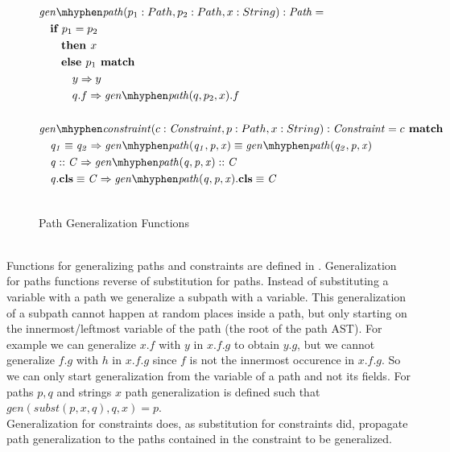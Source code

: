 \begin{figure}[t]
\centering
\begin{align*}
&\genp(p_1: Path, p_2: Path, x: String):\mIt{Path} = \\
&\quad\If p_1 = p_2\\
&\qquad \Then x\\
&\qquad \Else p_1 \match\\
&\qquad\quad y \Rightarrow y\\
&\qquad\quad q.f \Rightarrow \genp(q, p_2, x).f\\
\\
&\genc(c: \Constr, p: Path, x: String): \Constr = c \match\\
&\quad \case{\pathEq{q_1}{q_2}}
  {\pathEq
    {\genp(q_1, p, x)}
    {\genp(q_2, p, x)}}\\
&\quad \case{\instOf{q}{C}}
  {\instOf{\genp(q, p, x)}{C}}\\
&\quad \case{\instBy{q}{C}}
  {\instBy{\genp(q, p, x)}{C}}\\\\
\end{align*}
\caption{Path Generalization Functions}
\label{fig:axioms-general-gen}
\end{figure}\\
Functions for generalizing paths and constraints are defined in .
Generalization for paths functions reverse of substitution for paths.
Instead of substituting a variable with a path we generalize a subpath with a variable.
This generalization of a subpath cannot happen at random places inside a path,
but only starting on the innermost/leftmost variable of the path (the root of the path AST).
For example we can generalize $x.f$ with $y$ in $x.f.g$ to obtain $y.g$,
but we cannot generalize $f.g$ with $h$ in $x.f.g$
since $f$ is not the innermost occurence in $x.f.g$.
So we can only start generalization from the variable of a path and not its fields.
For paths $p, q$ and strings $x$ path generalization is defined
such that $gen(subst(p, x, q), q, x) = p$.\\
Generalization for constraints does,
as substitution for constraints did,
propagate path generalization to the paths contained in the constraint
to be generalized.

